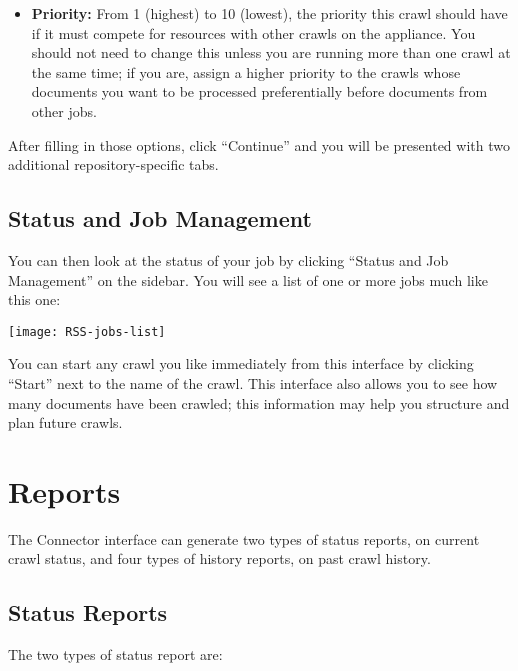 \begin{changemargin}{1.5in}{0in}
\begin{itemize}
\item \textbf{Priority:} From 1 (highest) to 10 (lowest), the priority
this crawl should have if it must compete for resources with other
crawls on the appliance. You should not need to change this unless you
are running more than one crawl at the same time; if you are, assign a
higher priority to the crawls whose documents you want to be processed
preferentially before documents from other jobs.

\end{itemize}

After filling in those options, click ``Continue'' and you will be
presented with two additional repository-specific tabs.



\subsection{\label{ManageJobs}Status and Job Management}

You can then look at the status of your job by clicking ``Status and 
Job Management'' on the sidebar. You will see a list of one or more jobs
much like this one:

\texttt{[image: RSS-jobs-list]}

You can start any crawl you like immediately from this interface by
clicking ``Start'' next to the name of the crawl. This interface also
allows you to see how many documents have been crawled; this information
may help you structure and plan future crawls.


\section{Reports}

The Connector interface can generate two types of status reports, on
current crawl status, and four types of history reports, on past crawl
history.

\subsection{Status Reports}

The two types of status report are:

\begin{itemize}


\end{itemize}
\end{changemargin}
